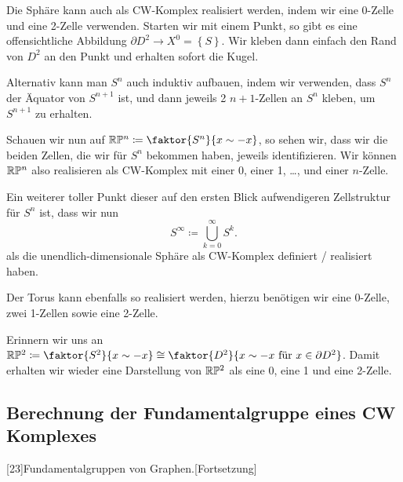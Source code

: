 \begin{example}
    Die Sphäre kann auch als CW-Komplex realisiert werden, indem wir eine 0-Zelle und eine 2-Zelle verwenden. Starten wir mit einem Punkt, so gibt es eine offensichtliche Abbildung $\partial D^2 \to  X^0 = \left \{S\right\} $. Wir kleben dann einfach den Rand von $D^2$ an den Punkt und erhalten sofort die Kugel.

    Alternativ kann man $S^n$ auch induktiv aufbauen, indem wir verwenden, dass  $S^n$ der Äquator von  $S^{n+1}$ ist, und dann jeweils 2 $n+1$-Zellen an  $S^n$ kleben, um  $S^{n+1}$ zu erhalten.

    Schauen wir nun auf $\R\mathbb{P}^n \coloneqq  \faktor{S^n}{x \sim -x}$, so sehen wir, dass wir die beiden Zellen, die wir für $S^n$ bekommen haben, jeweils identifizieren. Wir können  $\mathbb{R}\mathbb{P}^n$ also realisieren als CW-Komplex mit einer 0, einer 1, \ldots, und einer $n$-Zelle.

    Ein weiterer toller Punkt dieser auf den ersten Blick aufwendigeren Zellstruktur für  $S^n $ ist, dass wir nun
    \[
    S^{\infty} \coloneqq  \bigcup_{k=0}^{\infty} S^k 
    .\] 
    als die unendlich-dimensionale Sphäre als CW-Komplex definiert / realisiert haben.

    Der Torus kann ebenfalls so realisiert werden, hierzu benötigen wir eine 0-Zelle, zwei 1-Zellen sowie eine 2-Zelle.

    Erinnern wir uns an $\R\mathbb{P}^2 \coloneqq  \faktor{S^2}{x \sim  -x} \cong \faktor{D^2}{x \sim  -x \text{ für }x \in \partial D^2}$. Damit erhalten wir wieder eine Darstellung von $\mathbb{R}\mathbb{P}^2$ als eine 0, eine 1 und eine 2-Zelle.
\end{example}


\subsection{Berechnung der Fundamentalgruppe eines CW Komplexes}

[23]{Fundamentalgruppen von Graphen.}[Fortsetzung]

